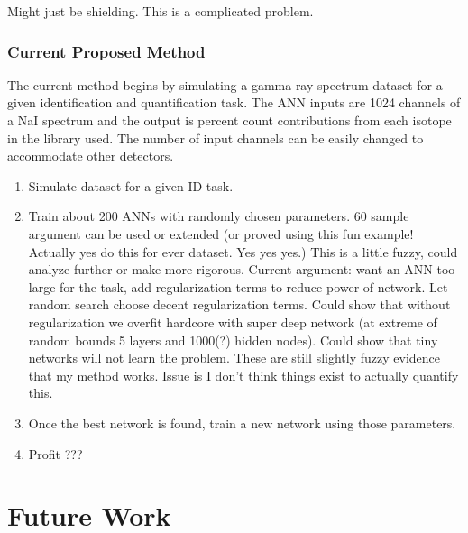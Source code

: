 \documentclass[10pt,letterpaper]{article}
\begin{document}
Might just be shielding. This is a complicated problem. 

\subsubsection{Current Proposed Method}


The current method begins by simulating a gamma-ray spectrum dataset for a given identification and quantification task. The ANN inputs are 1024 channels of a NaI spectrum and the output is percent count contributions from each isotope in the library used. The number of input channels can be easily changed to accommodate other detectors. 

\begin{enumerate}
    \item Simulate dataset for a given ID task. 
  
    \item Train about 200 ANNs with randomly chosen parameters. 60 sample argument can be used or extended (or proved using this fun example! Actually yes do this for ever dataset. Yes yes yes.)
    \subitem This is a little fuzzy, could analyze further or make more rigorous.
    \subitem Current argument: want an ANN too large for the task, add regularization terms to reduce power of network. Let random search choose decent regularization terms. 
    \subsubitem Could show that without regularization we overfit hardcore with super deep network (at extreme of random bounds 5 layers and 1000(?) hidden nodes). 
    \subsubitem Could show that tiny networks will not learn the problem.
    \subsubitem These are still slightly fuzzy evidence that my method works. Issue is I don't think things exist to actually quantify this.

    \item Once the best network is found, train a new network using those parameters.
    
    \item Profit ???









\end{enumerate}





\section{Future Work}
\end{document}
